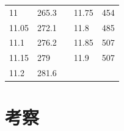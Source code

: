 \begin{table}[H]
\begin{tabular}{|l|l|lll}
  11           & 265.3        & \multicolumn{1}{l|}{} & \multicolumn{1}{l|}{11.75}        & \multicolumn{1}{l|}{454}          \\ \cline{1-2} \cline{4-5}
  11.05        & 272.1        & \multicolumn{1}{l|}{} & \multicolumn{1}{l|}{11.8}         & \multicolumn{1}{l|}{485}          \\ \cline{1-2} \cline{4-5}
  11.1         & 276.2        & \multicolumn{1}{l|}{} & \multicolumn{1}{l|}{11.85}        & \multicolumn{1}{l|}{507}          \\ \cline{1-2} \cline{4-5}
  11.15        & 279          & \multicolumn{1}{l|}{} & \multicolumn{1}{l|}{11.9}         & \multicolumn{1}{l|}{507}          \\ \cline{1-2} \cline{4-5}
  11.2         & 281.6        &                       &                                   &                                   \\ \cline{1-2}
  \end{tabular}
  \end{table}

\newpage
\section{考察}


